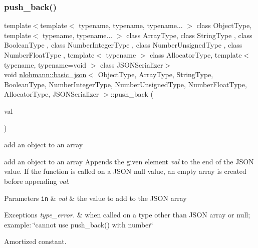 \subsubsection{\texorpdfstring{push\+\_\+back()}{push\_back()}\hspace{0.1cm}{\footnotesize\ttfamily [2/4]}}
{\footnotesize\ttfamily template$<$template$<$ typename, typename, typename... $>$ class Object\+Type, template$<$ typename, typename... $>$ class Array\+Type, class String\+Type , class Boolean\+Type , class Number\+Integer\+Type , class Number\+Unsigned\+Type , class Number\+Float\+Type , template$<$ typename $>$ class Allocator\+Type, template$<$ typename, typename=void $>$ class J\+S\+O\+N\+Serializer$>$ \\
void \hyperlink{classnlohmann_1_1basic__json}{nlohmann\+::basic\+\_\+json}$<$ Object\+Type, Array\+Type, String\+Type, Boolean\+Type, Number\+Integer\+Type, Number\+Unsigned\+Type, Number\+Float\+Type, Allocator\+Type, J\+S\+O\+N\+Serializer $>$\+::push\+\_\+back (\begin{DoxyParamCaption}\item[{const \hyperlink{classnlohmann_1_1basic__json}{basic\+\_\+json}$<$ Object\+Type, Array\+Type, String\+Type, Boolean\+Type, Number\+Integer\+Type, Number\+Unsigned\+Type, Number\+Float\+Type, Allocator\+Type, J\+S\+O\+N\+Serializer $>$ \&}]{val }\end{DoxyParamCaption})\hspace{0.3cm}{\ttfamily [inline]}}



add an object to an array 

add an object to an array Appends the given element {\itshape val} to the end of the J\+S\+ON value. If the function is called on a J\+S\+ON null value, an empty array is created before appending {\itshape val}.


\begin{DoxyParams}[1]{Parameters}
\mbox{\tt in}  & {\em val} & the value to add to the J\+S\+ON array\\
\hline
\end{DoxyParams}

\begin{DoxyExceptions}{Exceptions}
{\em type\+\_\+error.} & when called on a type other than J\+S\+ON array or null; example\+: {\ttfamily \char`\"{}cannot use push\+\_\+back() with number\char`\"{}}\\
\hline
\end{DoxyExceptions}
Amortized constant.

